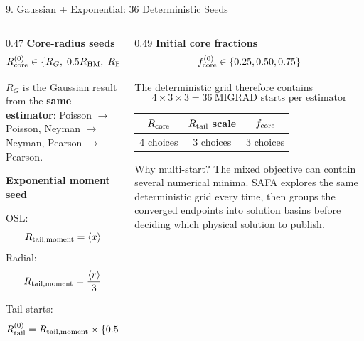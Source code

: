 \documentclass{beamer}
\begin{document}
\begin{frame}{9. Gaussian + Exponential: 36 Deterministic Seeds}
\fontsize{6.6}{7.4}\selectfont

\begin{columns}[T]

\begin{column}{0.47\textwidth}
\textbf{Core-radius seeds}
\[
R_{\rm core}^{(0)}\in
\left\{
R_G,\;0.5R_{\rm HM},\;R_{\rm HM},\;2R_{\rm HM}
\right\}
\]

$R_G$ is the Gaussian result from the \textbf{same estimator}: Poisson $\to$ Poisson, Neyman $\to$ Neyman, Pearson $\to$ Pearson.

\medskip
\textbf{Exponential moment seed}

OSL:
\[
R_{\rm tail,moment}=\langle x\rangle
\]
Radial:
\[
R_{\rm tail,moment}=\frac{\langle r\rangle}{3}
\]

Tail starts:
\[
R_{\rm tail}^{(0)}=R_{\rm tail,moment}\times\{0.5,1,2\}
\]
\end{column}

\begin{column}{0.49\textwidth}
\textbf{Initial core fractions}
\[
f_{\rm core}^{(0)}\in\{0.25,0.50,0.75\}
\]

\medskip
The deterministic grid therefore contains
\[
4\times3\times3=
\boxed{36\ \text{MIGRAD starts per estimator}}
\]

\begin{center}
\begin{tabular}{c|c|c}
$R_{\rm core}$ & $R_{\rm tail}$ scale & $f_{\rm core}$ \\
\hline
4 choices & 3 choices & 3 choices
\end{tabular}
\end{center}

\begin{alertblock}{Why multi-start?}
The mixed objective can contain several numerical minima. SAFA explores the same deterministic grid every time, then groups the converged endpoints into solution basins before deciding which physical solution to publish.
\end{alertblock}
\end{column}

\end{columns}
\end{frame}
\end{document}
